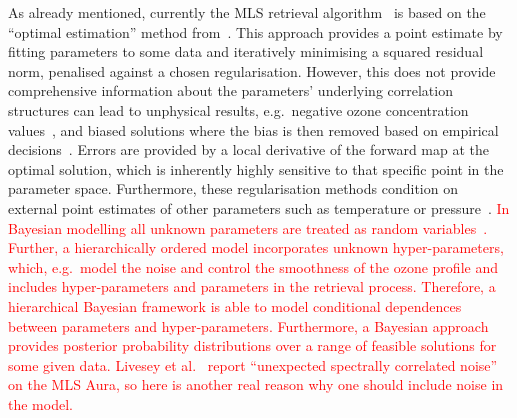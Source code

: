 As already mentioned, currently the MLS retrieval algorithm~\cite{livesey2006retrieval} is based on the ``optimal estimation'' method from~\cite{rodgers1976retrieval}.
This approach provides a point estimate by fitting parameters to some data and iteratively minimising a squared residual norm, penalised against a chosen regularisation.
However, this does not provide comprehensive information about the parameters' underlying correlation structures can lead to unphysical results, e.g.~negative ozone concentration values~\cite{MLSdata}, and biased solutions where the bias is then removed based on empirical decisions~\cite{livesey2008ozonecarbonmono, Froidevaux2008snrozone}.
Errors are provided by a local derivative of the forward map at the optimal solution, which is inherently highly sensitive to that specific point in the parameter space.
Furthermore, these regularisation methods condition on external point estimates of other parameters such as temperature or pressure~\cite{livesey2006retrieval}.
\textcolor{red}{
In Bayesian modelling all unknown parameters are treated as random variables~\cite{kaipio2005statinv}.
Further, a hierarchically ordered model incorporates unknown hyper-parameters, which, e.g.~model the noise and control the smoothness of the ozone profile and includes hyper-parameters and parameters in the retrieval process.
Therefore, a hierarchical Bayesian framework is able to model conditional dependences between parameters and hyper-parameters.
Furthermore, a Bayesian approach provides posterior probability distributions over a range of feasible solutions for some given data.
Livesey et al.~\cite{livesey2006retrieval} report ``unexpected spectrally correlated noise'' on the MLS Aura, so here is another real reason why one should include noise in the model.}

